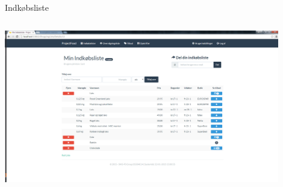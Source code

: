 \begin{frame}{Indkøbsliste}
\begin{minipage}[0.3\textheight]{\textwidth}
\begin{columns}[T]
\begin{column}{0.5\textwidth}
	  \includegraphics[width=0.9\textwidth,height=0.8\textheight,keepaspectratio]{images/Screenshots/ShoppingList.png}
	\end{column}
	\end{columns}
	

  \end{minipage}
	
\end{frame}


